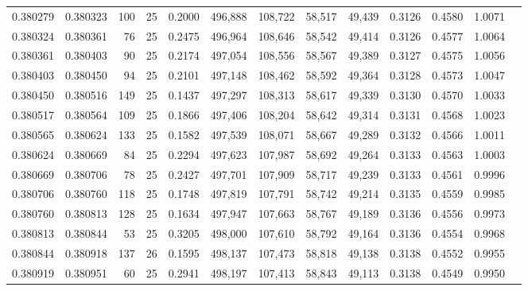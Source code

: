 \begin{tabular}{rrrrrrrrrrrrr}
0.380279 & 0.380323 &   100 &  25 &                                     0.2000 & 496,888 & 108,722 &  58,517 &  49,439 & 0.3126 & 0.4580 & 1.0071 \\
0.380324 & 0.380361 &    76 &  25 &                                     0.2475 & 496,964 & 108,646 &  58,542 &  49,414 & 0.3126 & 0.4577 & 1.0064 \\
0.380361 & 0.380403 &    90 &  25 &                                     0.2174 & 497,054 & 108,556 &  58,567 &  49,389 & 0.3127 & 0.4575 & 1.0056 \\
0.380403 & 0.380450 &    94 &  25 &                                     0.2101 & 497,148 & 108,462 &  58,592 &  49,364 & 0.3128 & 0.4573 & 1.0047 \\
0.380450 & 0.380516 &   149 &  25 &                                     0.1437 & 497,297 & 108,313 &  58,617 &  49,339 & 0.3130 & 0.4570 & 1.0033 \\
0.380517 & 0.380564 &   109 &  25 &                                     0.1866 & 497,406 & 108,204 &  58,642 &  49,314 & 0.3131 & 0.4568 & 1.0023 \\
0.380565 & 0.380624 &   133 &  25 &                                     0.1582 & 497,539 & 108,071 &  58,667 &  49,289 & 0.3132 & 0.4566 & 1.0011 \\
0.380624 & 0.380669 &    84 &  25 &                                     0.2294 & 497,623 & 107,987 &  58,692 &  49,264 & 0.3133 & 0.4563 & 1.0003 \\
0.380669 & 0.380706 &    78 &  25 &                                     0.2427 & 497,701 & 107,909 &  58,717 &  49,239 & 0.3133 & 0.4561 & 0.9996 \\
0.380706 & 0.380760 &   118 &  25 &                                     0.1748 & 497,819 & 107,791 &  58,742 &  49,214 & 0.3135 & 0.4559 & 0.9985 \\
0.380760 & 0.380813 &   128 &  25 &                                     0.1634 & 497,947 & 107,663 &  58,767 &  49,189 & 0.3136 & 0.4556 & 0.9973 \\
0.380813 & 0.380844 &    53 &  25 &                                     0.3205 & 498,000 & 107,610 &  58,792 &  49,164 & 0.3136 & 0.4554 & 0.9968 \\
0.380844 & 0.380918 &   137 &  26 &                                     0.1595 & 498,137 & 107,473 &  58,818 &  49,138 & 0.3138 & 0.4552 & 0.9955 \\
0.380919 & 0.380951 &    60 &  25 &                                     0.2941 & 498,197 & 107,413 &  58,843 &  49,113 & 0.3138 & 0.4549 & 0.9950 \\

\end{tabular}
